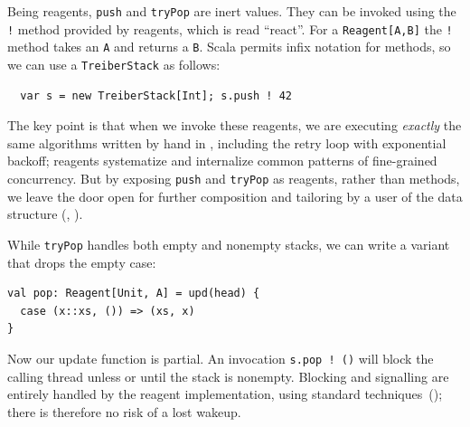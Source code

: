 \documentclass[preprint,nocopyrightspace]{sigplanconf}
\begin{document}
Being reagents, \lstinline{push} and \lstinline{tryPop} are inert values.  They
can be invoked using the \lstinline{!} method provided by reagents, which is
read ``react''.  For a \lstinline{Reagent[A,B]} the \lstinline{!} method takes
an \lstinline{A} and returns a \lstinline{B}.  Scala permits infix notation for
methods, so we can use a \lstinline{TreiberStack} as follows:
\begin{lstlisting}
  var s = new TreiberStack[Int]; s.push ! 42
\end{lstlisting}
The key point is that when we invoke these reagents, we are executing
\emph{exactly} the same algorithms written by hand in ,
including the retry loop with exponential backoff; reagents systematize and
internalize common patterns of fine-grained concurrency.  But by exposing
\lstinline{push} and \lstinline{tryPop} as reagents, rather than methods, we
leave the door open for further composition and tailoring by a user of the
data structure (, ).

While \lstinline{tryPop} handles both empty and nonempty stacks, we
can write a variant that drops the empty case:
\begin{lstlisting}
val pop: Reagent[Unit, A] = upd(head) {
  case (x::xs, ()) => (xs, x)
}
\end{lstlisting}
Now our update function is partial.  An invocation \lstinline{s.pop ! ()} will
block the calling thread unless or until the stack is nonempty.  Blocking and
signalling are entirely handled by the reagent implementation, using standard
techniques~(); there is therefore no risk of a lost
wakeup.  %


\end{document}
